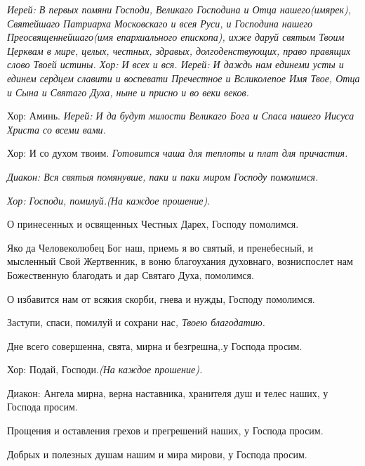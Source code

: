 \itshape  Иерей:\normalfont{} В первых помяни Господи, Великаго Господина и Отца нашего\itshape  (имярек),\normalfont{} Святейшаго Патриарха Московскаго и всея Руси, и Господина нашего Преосвященнейшаго\itshape  (имя епархиального епископ\normalfont{}а), ихже даруй святым Твоим Церквам в мире, целых, честных, здравых, долгоденствующих, право правящих слово Твоей истины. \itshape  Хор:\normalfont{} И всех и вся. \itshape  Иерей:\normalfont{} И даждь нам единеми усты и единем сердцем славити и воспевати Пречестно\itshape е\normalfont{} и Всликолепое Имя Твое, Отца и Сына и Святаго Духа, ныне и присно и во веки веков. \itshape 

 


  Хор:\normalfont{} Аминь. \itshape  Иерей:\normalfont{} И да будут милости Великаго Бога и Спаса нашего Иисуса Христа со всеми вами. \itshape 


  Хор:\normalfont{} И со духом твоим. \itshape  Готовится чаша для теплоты и плат для причастия\normalfont{}. 




\itshape  Диакон:\normalfont{} Вся святыя помянувше, паки и паки миром Господу помолимся. 


\itshape Хор:\normalfont{} Господи, помилуй.\itshape  (На каждое прошение)\normalfont{}. 


  О принесенных и освященных Честных Дарех, Господу помолимся. 


  Яко да Человеколюбец Бог наш, приемь я во святый, и пренебесный, и мысленный Свой Жертвенник, в воню благоухания духовнаго, возниспослет нам Божественную благодать и дар Святаго Духа, помолимся. 


  О избавится нам от всякия скорби, гнева и нужды, Господу помолимся. 


  Заступи, спаси, помилуй и сохрани нас\itshape ,\normalfont{} Твоею благодатию. 


  Дне всего совершенна, свята, мирна и безгрешна,.у Господа просим. \itshape 


  Хор:\normalfont{} Подай, Господи.\itshape  (На каждое прошение)\normalfont{}. \itshape 


  Диакон:\normalfont{} Ангела мирна, верна наставника, хранителя душ и телес наших, у Господа просим. 


  Прощения и оставления грехов и прегрешений наших, у Господа просим. 


  Добрых и полезных душам нашим и мира мирови, у Господа просим. 


